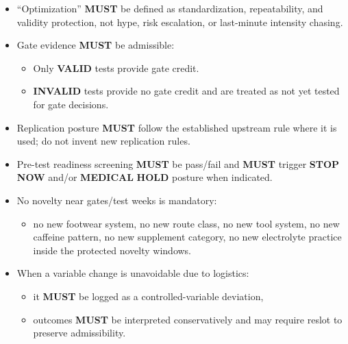 \documentclass[10pt]{article}
\begin{document}
\begin{itemize}
\item “Optimization” \textbf{MUST} be defined as standardization, repeatability, and validity protection, not hype, risk escalation, or last-minute intensity chasing.
\item Gate evidence \textbf{MUST} be admissible:
\begin{itemize}
\item Only \textbf{VALID} tests provide gate credit.
\item \textbf{INVALID} tests provide no gate credit and are treated as not yet tested for gate decisions.
\end{itemize}
\item Replication posture \textbf{MUST} follow the established upstream rule where it is used; do not invent new replication rules.
\item Pre-test readiness screening \textbf{MUST} be pass/fail and \textbf{MUST} trigger \textbf{STOP} \textbf{NOW} and/or \textbf{MEDICAL} \textbf{HOLD} posture when indicated.
\item No novelty near gates/test weeks is mandatory:
\begin{itemize}
\item no new footwear system, no new route class, no new tool system, no new caffeine pattern, no new supplement category, no new electrolyte practice inside the protected novelty windows.
\end{itemize}
\item When a variable change is unavoidable due to logistics:
\begin{itemize}
\item it \textbf{MUST} be logged as a controlled-variable deviation,
\item outcomes \textbf{MUST} be interpreted conservatively and may require reslot to preserve admissibility.
\end{itemize}
\end{itemize}

\begingroup
\scriptsize
\setlength{\tabcolsep}{2pt}
\renewcommand{\arraystretch}{1.12}
\end{document}
